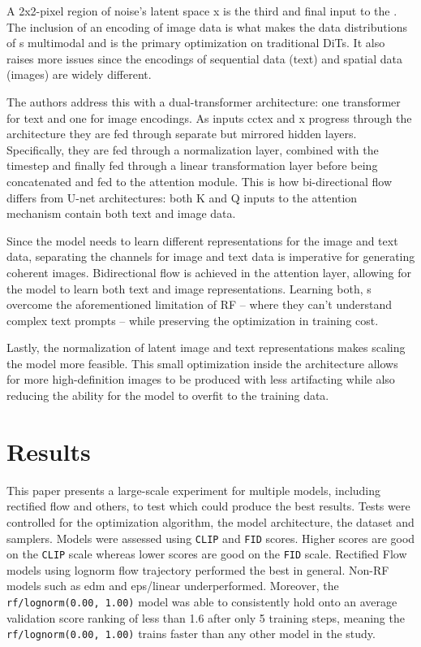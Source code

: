 \documentclass{genai}
\begin{document}
A 2x2-pixel region of noise’s latent space x is the third and final input to the \modelname . The inclusion of an encoding of image data is what makes the data distributions of \modelname s multimodal and is the primary optimization on traditional DiTs. It also raises more issues since the encodings of sequential data (text) and spatial data (images) are widely different. 

The authors address this with a dual-transformer architecture: one transformer for text and one for image encodings. As inputs cctex and x progress through the architecture they are fed through separate but mirrored hidden layers. Specifically, they are fed through a normalization layer, combined with the timestep and finally fed through a linear transformation layer before being concatenated and fed to the attention module. This is how bi-directional flow differs from U-net architectures: both K and Q inputs to the attention mechanism contain both text and image data.

Since the model needs to learn different representations for the image and text data, separating the channels for image and text data is imperative for generating coherent images. Bidirectional flow is achieved in the attention layer, allowing for the model to learn both text and image representations. Learning both, \modelname s overcome the aforementioned limitation of RF – where they can’t understand complex text prompts – while preserving the optimization in training cost.

Lastly, the normalization of latent image and text representations makes scaling the model more feasible. This small optimization inside the \modelname  architecture allows for more high-definition images to be produced with less artifacting while also reducing the ability for the model to overfit to the training data.


\section{Results}

\hspace{\parindent}This paper presents a large-scale experiment for multiple models, including rectified flow and others, to test which could produce the best results.
Tests were controlled for the optimization algorithm, the model architecture, the dataset and samplers.
Models were assessed using \texttt{CLIP} and \texttt{FID} scores.
Higher scores are good on the \texttt{CLIP} scale whereas lower scores are good on the \texttt{FID} scale. 
Rectified Flow models using lognorm flow trajectory performed the best in general. 
Non-RF models such as edm and eps/linear underperformed. 
Moreover, the \texttt{rf/lognorm(0.00, 1.00)} model was able to consistently hold onto an average validation score ranking of less than 1.6 after only 5 training steps,
meaning the \texttt{rf/lognorm(0.00, 1.00)} trains faster than any other model in the study.
\end{document}
